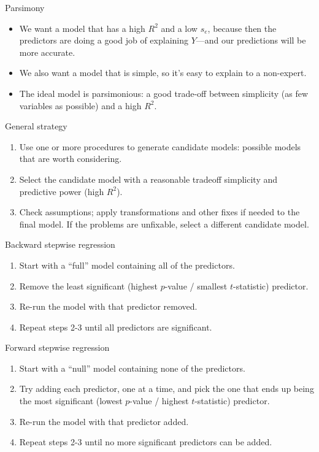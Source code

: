 \documentclass{beamer}\usepackage[]{graphicx}\usepackage[]{color}
\begin{document}
\begin{darkframes}
    \begin{frame}{Parsimony}
      \begin{itemize}[<+->]
        \item We want a model that has a high $R^2$ and a low $s_e$, because then the predictors are doing a good job of explaining $Y$---and our predictions will be more accurate.
        \item We also want a model that is simple, so it's easy to explain to a non-expert.
        \item The ideal model is \alert{parsimonious}: a good trade-off between simplicity (as few variables as possible) and a high $R^2$.
      \end{itemize}
    \end{frame}

    \begin{frame}{General strategy}
      \begin{enumerate}[<+->]
        \item Use one or more procedures to generate candidate models: possible models that are worth considering.
        \item Select the candidate model with a reasonable tradeoff simplicity and predictive power (high $R^2$).
        \item Check assumptions; apply transformations and other fixes if needed to the final model. If the problems are unfixable, select a different candidate model.
      \end{enumerate}
    \end{frame}

    \begin{frame}{Backward stepwise regression}
      \begin{enumerate}
        \item Start with a ``full'' model containing all of the predictors.
        \item Remove the least significant (highest $p$-value / smallest $t$-statistic) predictor.
        \item Re-run the model with that predictor removed.
        \item Repeat steps 2-3 until all predictors are significant.
      \end{enumerate}
    \end{frame}

    \begin{frame}{Forward stepwise regression}
      \begin{enumerate}
        \item Start with a ``null'' model containing none of the predictors.
        \item Try adding each predictor, one at a time, and pick the one that ends up being the most significant (lowest $p$-value / highest $t$-statistic) predictor.
        \item Re-run the model with that predictor added.
        \item Repeat steps 2-3 until no more significant predictors can be added.
      \end{enumerate}
    \end{frame}


\end{darkframes}
\end{document}
